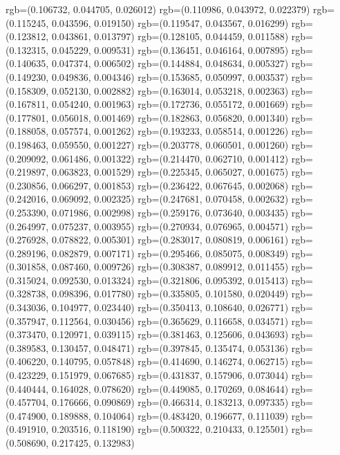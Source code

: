 {{{					rgb=(0.106732, 0.044705, 0.026012)
					rgb=(0.110986, 0.043972, 0.022379)
					rgb=(0.115245, 0.043596, 0.019150)
					rgb=(0.119547, 0.043567, 0.016299)
					rgb=(0.123812, 0.043861, 0.013797)
					rgb=(0.128105, 0.044459, 0.011588)
					rgb=(0.132315, 0.045229, 0.009531)
					rgb=(0.136451, 0.046164, 0.007895)
					rgb=(0.140635, 0.047374, 0.006502)
					rgb=(0.144884, 0.048634, 0.005327)
					rgb=(0.149230, 0.049836, 0.004346)
					rgb=(0.153685, 0.050997, 0.003537)
					rgb=(0.158309, 0.052130, 0.002882)
					rgb=(0.163014, 0.053218, 0.002363)
					rgb=(0.167811, 0.054240, 0.001963)
					rgb=(0.172736, 0.055172, 0.001669)
					rgb=(0.177801, 0.056018, 0.001469)
					rgb=(0.182863, 0.056820, 0.001340)
					rgb=(0.188058, 0.057574, 0.001262)
					rgb=(0.193233, 0.058514, 0.001226)
					rgb=(0.198463, 0.059550, 0.001227)
					rgb=(0.203778, 0.060501, 0.001260)
					rgb=(0.209092, 0.061486, 0.001322)
					rgb=(0.214470, 0.062710, 0.001412)
					rgb=(0.219897, 0.063823, 0.001529)
					rgb=(0.225345, 0.065027, 0.001675)
					rgb=(0.230856, 0.066297, 0.001853)
					rgb=(0.236422, 0.067645, 0.002068)
					rgb=(0.242016, 0.069092, 0.002325)
					rgb=(0.247681, 0.070458, 0.002632)
					rgb=(0.253390, 0.071986, 0.002998)
					rgb=(0.259176, 0.073640, 0.003435)
					rgb=(0.264997, 0.075237, 0.003955)
					rgb=(0.270934, 0.076965, 0.004571)
					rgb=(0.276928, 0.078822, 0.005301)
					rgb=(0.283017, 0.080819, 0.006161)
					rgb=(0.289196, 0.082879, 0.007171)
					rgb=(0.295466, 0.085075, 0.008349)
					rgb=(0.301858, 0.087460, 0.009726)
					rgb=(0.308387, 0.089912, 0.011455)
					rgb=(0.315024, 0.092530, 0.013324)
					rgb=(0.321806, 0.095392, 0.015413)
					rgb=(0.328738, 0.098396, 0.017780)
					rgb=(0.335805, 0.101580, 0.020449)
					rgb=(0.343036, 0.104977, 0.023440)
					rgb=(0.350413, 0.108640, 0.026771)
					rgb=(0.357947, 0.112564, 0.030456)
					rgb=(0.365629, 0.116658, 0.034571)
					rgb=(0.373470, 0.120971, 0.039115)
					rgb=(0.381463, 0.125606, 0.043693)
					rgb=(0.389583, 0.130457, 0.048471)
					rgb=(0.397845, 0.135474, 0.053136)
					rgb=(0.406220, 0.140795, 0.057848)
					rgb=(0.414690, 0.146274, 0.062715)
					rgb=(0.423229, 0.151979, 0.067685)
					rgb=(0.431837, 0.157906, 0.073044)
					rgb=(0.440444, 0.164028, 0.078620)
					rgb=(0.449085, 0.170269, 0.084644)
					rgb=(0.457704, 0.176666, 0.090869)
					rgb=(0.466314, 0.183213, 0.097335)
					rgb=(0.474900, 0.189888, 0.104064)
					rgb=(0.483420, 0.196677, 0.111039)
					rgb=(0.491910, 0.203516, 0.118190)
					rgb=(0.500322, 0.210433, 0.125501)
					rgb=(0.508690, 0.217425, 0.132983)
}}}
